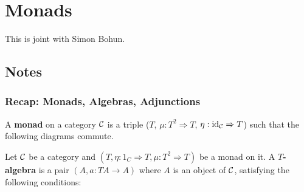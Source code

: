 \documentclass[12pt]{article}
\begin{document}
\section{Monads}
This is joint with Simon Bohun.

\subsection{Notes}

\subsubsection{Recap: Monads, Algebras, Adjunctions}

\begin{defn}
    A \textbf{monad} on a category $\mathcal{C}$ is a triple ($T$, $\mu: T^2 \Rightarrow T$, $\eta: \mathrm{id}_{\mathcal{C}} \Rightarrow T$) such that the following diagrams commute.
    \begin{center}
    \qquad
    \end{center}
\end{defn}

\begin{defn}
    Let $\mathcal{C}$ be a category and $(T,\eta: 1_C \Rightarrow T, \mu: T^2\Rightarrow T)$ be a monad on it. A \textbf{$T$-algebra} is a pair $(A,a:TA \to A)$ where $A$ is an object of $\mathcal{C}$, satisfying the following conditions:
    \begin{center}
        \qquad
    \end{center}
\end{defn}
\end{document}
